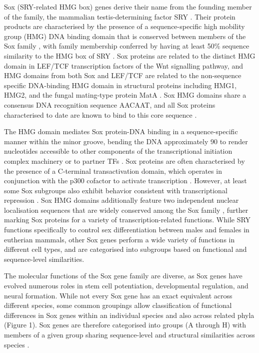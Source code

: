 \documentclass[withindex,glossary]{cam-thesis}
\begin{document}
Sox (SRY-related HMG box) genes derive their name from the founding
member of the family, the mammalian testis-determining factor SRY
. Their protein products are characterised
by the presence of a sequence-specific high mobility group (HMG) DNA
binding domain that is conserved between members of the Sox family
, with family membership conferred by having at
least 50\% sequence similarity to the HMG box of SRY . Sox proteins are related to the distinct HMG domain in LEF/TCF
transcription factors of the Wnt signalling pathway, and HMG domains
from both Sox and LEF/TCF are related to the non-sequence specific
DNA-binding HMG domain in structural proteins including HMG1, HMG2, and
the fungal mating-type protein MatA . Sox HMG domains share a consensus DNA recognition sequence AACAAT, and all Sox proteins characterised to date
are known to bind to this core sequence .

The HMG domain mediates Sox protein-DNA binding in a sequence-specific
manner within the minor groove, bending the DNA approximately 90\textdegree{} to
render nucleotides accessible to other components of the transcriptional
initiation complex machinery or to partner TFs .
Sox proteins are often characterised by the presence of a C-terminal
transactivation domain, which operates in conjunction with the p300
cofactor to activate transcription . However, at
least some Sox subgroups also exhibit behavior consistent with
transcriptional repression . Sox HMG domains
additionally feature two independent nuclear localisation sequences that
are widely conserved among the Sox family ,
further marking Sox proteins for a variety of transcription-related
functions. While SRY functions specifically to control sex
differentiation between males and females in eutherian mammals, other
Sox genes perform a wide variety of functions in different cell types,
and are categorised into subgroups based on functional and
sequence-level similarities.

The molecular functions of the Sox gene family are diverse, as Sox genes
have evolved numerous roles in stem cell potentiation, developmental
regulation, and neural formation. While not every Sox gene has an exact
equivalent across different species, some common groupings allow
classification of functional differences in Sox genes within an
individual species and also across related phyla (Figure 1). Sox genes
are therefore categorised into groups (A through H) with members of a
given group sharing sequence-level and structural similarities across
species .
\end{document}
